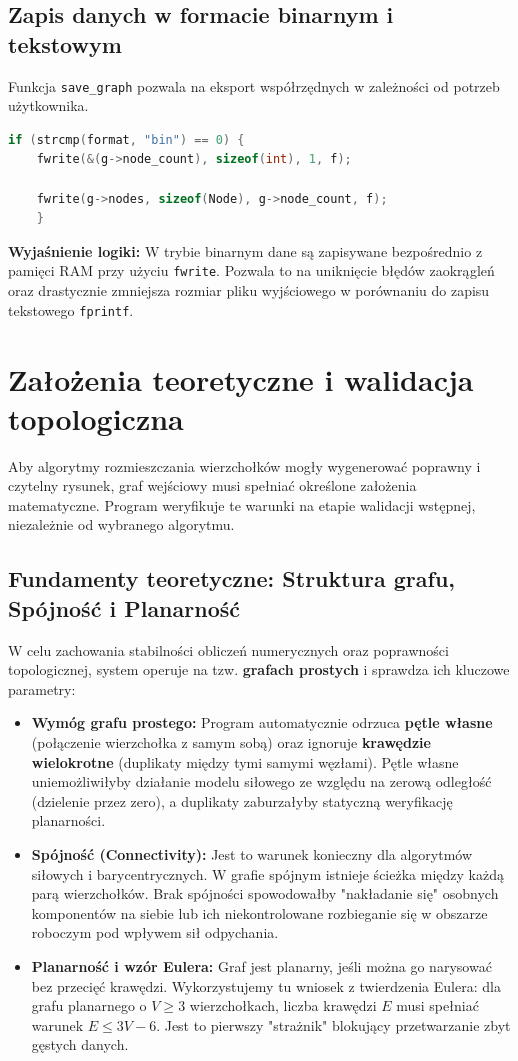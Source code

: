 \documentclass[12pt,a4paper]{article}
\begin{document}
\subsection{Zapis danych w formacie binarnym i tekstowym}
Funkcja \texttt{save\_graph} pozwala na eksport współrzędnych w zależności od potrzeb użytkownika.
\begin{lstlisting}[language=C, caption={Obsługa formatu binarnego w save\_graph}]
if (strcmp(format, "bin") == 0) {
    fwrite(&(g->node_count), sizeof(int), 1, f);
    
    fwrite(g->nodes, sizeof(Node), g->node_count, f);
    }
    \end{lstlisting}
\textbf{Wyjaśnienie logiki:} W trybie binarnym dane są zapisywane bezpośrednio z pamięci RAM przy użyciu \texttt{fwrite}. Pozwala to na uniknięcie błędów zaokrągleń oraz drastycznie zmniejsza rozmiar pliku wyjściowego w porównaniu do zapisu tekstowego \texttt{fprintf}.


\section{Założenia teoretyczne i walidacja topologiczna}

Aby algorytmy rozmieszczania wierzchołków mogły wygenerować poprawny i czytelny rysunek, graf wejściowy musi spełniać określone założenia matematyczne. Program weryfikuje te warunki na etapie walidacji wstępnej, niezależnie od wybranego algorytmu.

\subsection{Fundamenty teoretyczne: Struktura grafu, Spójność i Planarność}
W celu zachowania stabilności obliczeń numerycznych oraz poprawności topologicznej, system operuje na tzw. \textbf{grafach prostych} i sprawdza ich kluczowe parametry:

\begin{itemize}
    \item \textbf{Wymóg grafu prostego:} Program automatycznie odrzuca \textbf{pętle własne} (połączenie wierzchołka z samym sobą) oraz ignoruje \textbf{krawędzie wielokrotne} (duplikaty między tymi samymi węzłami). Pętle własne uniemożliwiłyby działanie modelu siłowego ze względu na zerową odległość (dzielenie przez zero), a duplikaty zaburzałyby statyczną weryfikację planarności.
    \item \textbf{Spójność (Connectivity):} Jest to warunek konieczny dla algorytmów siłowych i barycentrycznych. W grafie spójnym istnieje ścieżka między każdą parą wierzchołków. Brak spójności spowodowałby "nakładanie się" osobnych komponentów na siebie lub ich niekontrolowane rozbieganie się w obszarze roboczym pod wpływem sił odpychania.
    \item \textbf{Planarność i wzór Eulera:} Graf jest planarny, jeśli można go narysować bez przecięć krawędzi. Wykorzystujemy tu wniosek z twierdzenia Eulera: dla grafu planarnego o $V \ge 3$ wierzchołkach, liczba krawędzi $E$ musi spełniać warunek $E \le 3V - 6$. Jest to pierwszy "strażnik" blokujący przetwarzanie zbyt gęstych danych.
\end{itemize}
\newpage
\end{document}
